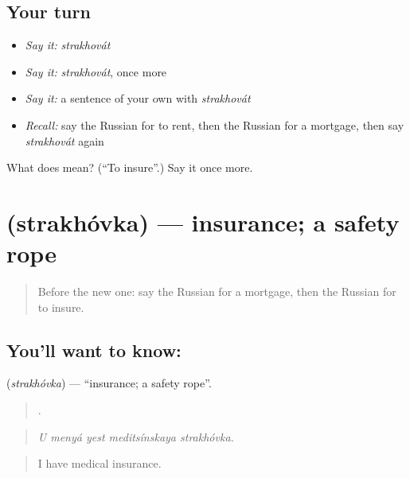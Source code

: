 \subsection*{Your turn}
\begin{itemize}
\raggedright
  \item \emph{Say it:} \emph{strakhovát}
  \item \emph{Say it:} \emph{strakhovát}, once more
  \item \emph{Say it:} a sentence of your own with \emph{strakhovát}
  \item \emph{Recall:} say the Russian for to rent, then the Russian for a mortgage, then say \emph{strakhovát} again
\end{itemize}

\begin{tcolorbox}[breakable,colback=teal!4,colframe=teal!35!black,title={Before you move on}]
What does  mean? (\textquotedblleft{}To insure\textquotedblright{}.) Say it once more.
\end{tcolorbox}
\section[\texorpdfstring{\ru{страховка} (strakhóvka)}{страховка (strakhóvka)}]{ (strakhóvka) — insurance; a safety rope}

\label{lesson:RU-C398-strakhovka}



\begin{quote}
Before the new one: say the Russian for a mortgage, then the Russian for to insure.
\end{quote}

\subsection*{You'll want to know: }
\textbf{} (\emph{strakhóvka}) — \textquotedblleft{}insurance; a safety rope\textquotedblright{}.

\begin{quote}
    .
\end{quote}

\begin{quote}
\emph{U menyá yest meditsínskaya strakhóvka.}
\end{quote}

\begin{quote}
I have medical insurance.
\end{quote}


